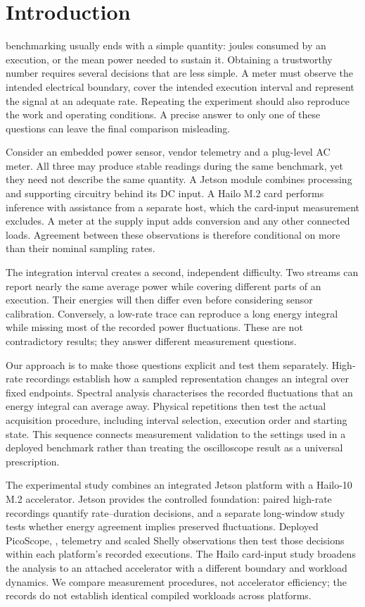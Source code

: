 \section{Introduction}
 benchmarking usually ends with a simple quantity: joules consumed by an execution, or the mean power needed to sustain it. Obtaining a trustworthy number requires several decisions that are less simple. A meter must observe the intended electrical boundary, cover the intended execution interval and represent the signal at an adequate rate. Repeating the experiment should also reproduce the work and operating conditions. A precise answer to only one of these questions can leave the final comparison misleading.

Consider an embedded power sensor, vendor telemetry and a plug-level AC meter. All three may produce stable readings during the same benchmark, yet they need not describe the same quantity. A Jetson module combines processing and supporting circuitry behind its DC input. A Hailo M.2 card performs inference with assistance from a separate host, which the card-input measurement excludes. A meter at the supply input adds conversion and any other connected loads. Agreement between these observations is therefore conditional on more than their nominal sampling rates.

The integration interval creates a second, independent difficulty. Two streams can report nearly the same average power while covering different parts of an execution. Their energies will then differ even before considering sensor calibration. Conversely, a low-rate trace can reproduce a long energy integral while missing most of the recorded power fluctuations. These are not contradictory results; they answer different measurement questions.

Our approach is to make those questions explicit and test them separately. High-rate recordings establish how a sampled representation changes an integral over fixed endpoints. Spectral analysis characterises the recorded fluctuations that an energy integral can average away. Physical repetitions then test the actual acquisition procedure, including interval selection, execution order and starting state. This sequence connects measurement validation to the settings used in a deployed benchmark rather than treating the oscilloscope result as a universal prescription.


The experimental study combines an integrated Jetson platform with a Hailo-10 M.2 accelerator. Jetson provides the controlled foundation: paired high-rate recordings quantify rate--duration decisions, and a separate long-window study tests whether energy agreement implies preserved fluctuations. Deployed PicoScope, \urecs{}, telemetry and scaled Shelly observations then test those decisions within each platform's recorded executions. The Hailo card-input study broadens the analysis to an attached accelerator with a different boundary and workload dynamics. We compare measurement procedures, not accelerator efficiency; the records do not establish identical compiled workloads across platforms.

